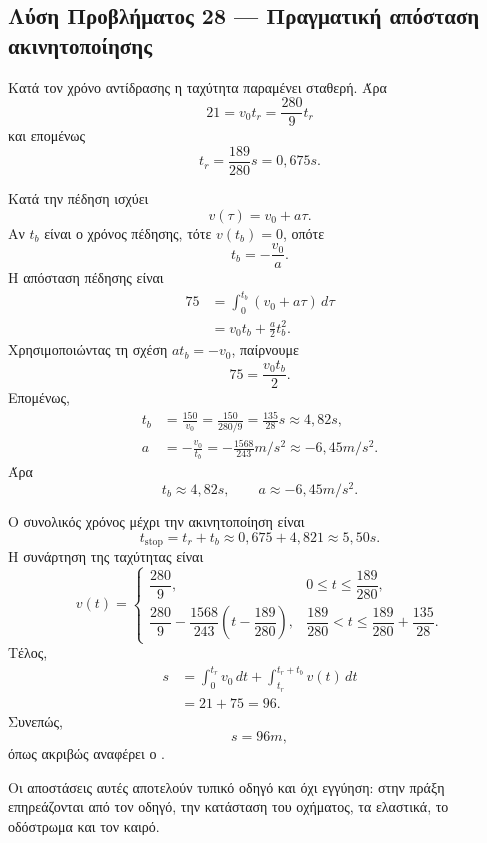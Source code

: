 \subsection*{Λύση Προβλήματος 28 --- Πραγματική απόσταση ακινητοποίησης}

\begin{alist}
  \item Κατά τον χρόνο αντίδρασης η ταχύτητα παραμένει σταθερή. Άρα
        \[
          21=v_0t_r=\frac{280}{9}t_r
        \]
        και επομένως
        \[
          {t_r=\frac{189}{280}\si{s}=0{,}675\si{s}}.
        \]

  \item Κατά την πέδηση ισχύει
        \[
          v(\tau)=v_0+a\tau.
        \]
        Αν $t_b$ είναι ο χρόνος πέδησης, τότε $v(t_b)=0$, οπότε
        \[
          t_b=-\frac{v_0}{a}.
        \]
        Η απόσταση πέδησης είναι
        \begin{align*}
          75
          &=\int_0^{t_b}(v_0+a\tau)\,d\tau\\
          &=v_0t_b+\frac{a}{2}t_b^2.
        \end{align*}
        Χρησιμοποιώντας τη σχέση $a t_b=-v_0$, παίρνουμε
        \[
          75=\frac{v_0t_b}{2}.
        \]
        Επομένως,
        \begin{align*}
          t_b
          &=\frac{150}{v_0}
           =\frac{150}{280/9}
           =\frac{135}{28}\si{s}
           \approx4{,}82\si{s},\\
          a
          &=-\frac{v_0}{t_b}
           =-\frac{1568}{243}\si{m/s^2}
           \approx-6{,}45\si{m/s^2}.
        \end{align*}
        Άρα
        \[
          {t_b\approx4{,}82\si{s}},
          \qquad
          {a\approx-6{,}45\si{m/s^2}}.
        \]

  \item Ο συνολικός χρόνος μέχρι την ακινητοποίηση είναι
        \[
          t_{\mathrm{stop}}=t_r+t_b
          \approx0{,}675+4{,}821
          \approx5{,}50\si{s}.
        \]
        Η συνάρτηση της ταχύτητας είναι
        \[
          v(t)=
          \begin{cases}
          \dfrac{280}{9},
            &0\leq t\leq\dfrac{189}{280},\\[2mm]
          \dfrac{280}{9}
          -\dfrac{1568}{243}
          \left(t-\dfrac{189}{280}\right),
            &\dfrac{189}{280}<t\leq
             \dfrac{189}{280}+\dfrac{135}{28}.
          \end{cases}
        \]
        Τέλος,
        \begin{align*}
          s
          &=\int_0^{t_r}v_0\,dt
            +\int_{t_r}^{t_r+t_b}v(t)\,dt\\
          &=21+75=96.
        \end{align*}
        Συνεπώς,
        \[
          {s=96\si{m}},
        \]
        όπως ακριβώς αναφέρει ο .

        Οι αποστάσεις αυτές αποτελούν τυπικό οδηγό και όχι εγγύηση:
        στην πράξη επηρεάζονται από τον οδηγό, την κατάσταση του
        οχήματος, τα ελαστικά, το οδόστρωμα και τον καιρό.
\end{alist}
